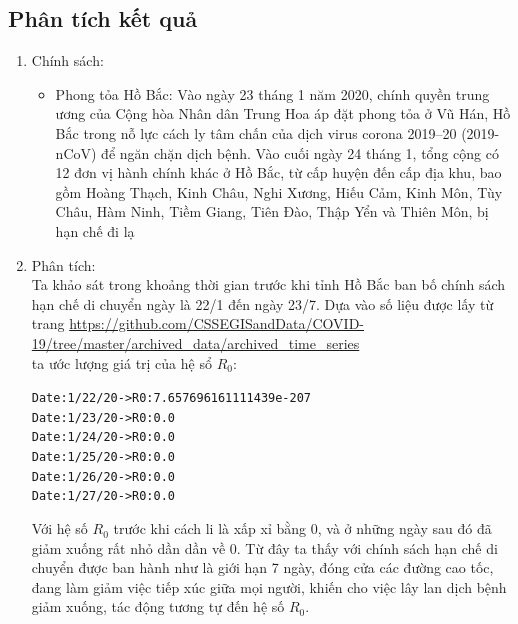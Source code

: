 \documentclass[a4paper]{article}
\begin{document}
\subsection{Phân tích kết quả}
\begin{enumerate}
    \item Chính sách:
    \begin{itemize}
        \item Phong tỏa Hồ Bắc: Vào ngày 23 tháng 1 năm 2020, chính quyền trung ương của Cộng hòa Nhân dân Trung Hoa áp đặt phong tỏa ở Vũ Hán, Hồ Bắc trong nỗ lực cách ly tâm chấn của dịch virus corona 2019–20 (2019-nCoV) để ngăn chặn dịch bệnh. Vào cuối ngày 24 tháng 1, tổng cộng có 12 đơn vị hành chính khác ở Hồ Bắc, từ cấp huyện đến cấp địa khu, bao gồm Hoàng Thạch, Kinh Châu, Nghi Xương, Hiếu Cảm, Kinh Môn, Tùy Châu, Hàm Ninh, Tiềm Giang, Tiên Đào, Thập Yển và Thiên Môn, bị hạn chế đi lạ
    \end{itemize}
    \item Phân tích:\\
Ta khảo sát trong khoảng thời gian trước khi tỉnh Hồ Bắc ban bố chính sách hạn chế di chuyển ngày là 22/1 đến ngày 23/7. Dựa vào số liệu được lấy từ trang \url{https://github.com/CSSEGISandData/COVID-19/tree/master/archived_data/archived_time_series}\\
ta ước lượng giá trị của hệ sổ $R_{0}$:
   	 \begin{mdframed}[hidealllines=true,backgroundcolor=magenta!10]
	 \begin{alltt}
Date:  1/22/20 ->R0:  7.657696161111439e-207
Date:  1/23/20 ->R0:  0.0
Date:  1/24/20 ->R0:  0.0
Date:  1/25/20 ->R0:  0.0
Date:  1/26/20 ->R0:  0.0
Date:  1/27/20 ->R0:  0.0
	 \end{alltt}
	 \end{mdframed}
    Với hệ số $R_{0}$ trước khi cách li là xấp xỉ bằng 0, và ở những ngày sau đó đã giảm xuống rất nhỏ dần dần về 0.
    Từ đây ta thấy với chính sách hạn chế di chuyển được ban hành như là giới hạn 7 ngày, đóng cửa các đường cao tốc, đang làm giảm việc tiếp xúc giữa mọi người, khiến cho việc lây lan dịch bệnh giảm xuống, tác động tương tự đến hệ số $R_{0}$.
\end{enumerate}
\end{document}
